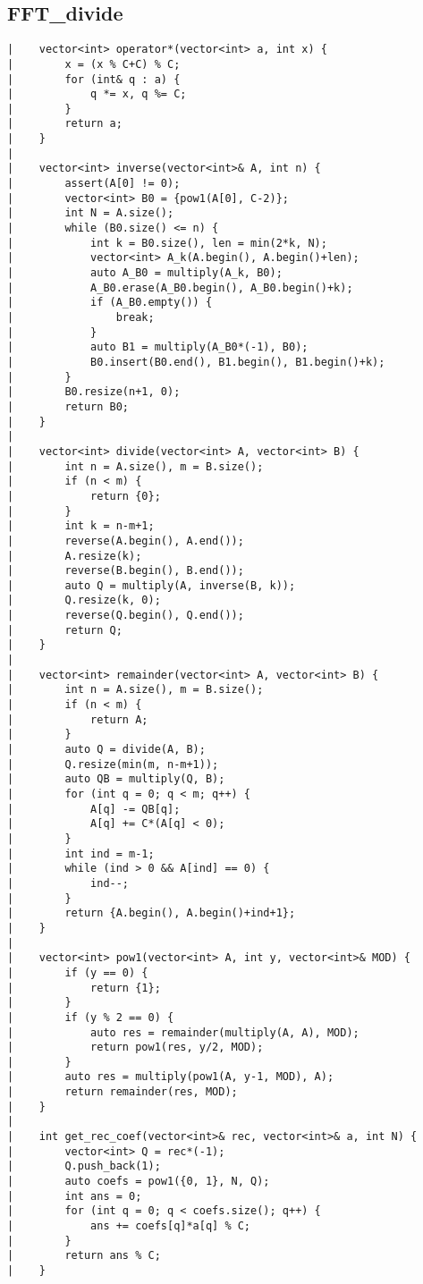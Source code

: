\documentclass[a4paper, 10pt]{article}
\begin{document}
\begin{center}
\section*{FFT\_divide}
\begin{verbatim}
|    vector<int> operator*(vector<int> a, int x) {
|        x = (x % C+C) % C;
|        for (int& q : a) {
|            q *= x, q %= C;
|        }
|        return a;
|    }
|    
|    vector<int> inverse(vector<int>& A, int n) {
|        assert(A[0] != 0);
|        vector<int> B0 = {pow1(A[0], C-2)};
|        int N = A.size();
|        while (B0.size() <= n) {
|            int k = B0.size(), len = min(2*k, N);
|            vector<int> A_k(A.begin(), A.begin()+len);
|            auto A_B0 = multiply(A_k, B0);
|            A_B0.erase(A_B0.begin(), A_B0.begin()+k);
|            if (A_B0.empty()) {
|                break;
|            }
|            auto B1 = multiply(A_B0*(-1), B0);
|            B0.insert(B0.end(), B1.begin(), B1.begin()+k);
|        }
|        B0.resize(n+1, 0);
|        return B0;
|    }
|    
|    vector<int> divide(vector<int> A, vector<int> B) {
|        int n = A.size(), m = B.size();
|        if (n < m) {
|            return {0};
|        }
|        int k = n-m+1;
|        reverse(A.begin(), A.end());
|        A.resize(k);
|        reverse(B.begin(), B.end());
|        auto Q = multiply(A, inverse(B, k));
|        Q.resize(k, 0);
|        reverse(Q.begin(), Q.end());
|        return Q;
|    }
|    
|    vector<int> remainder(vector<int> A, vector<int> B) {
|        int n = A.size(), m = B.size();
|        if (n < m) {
|            return A;
|        }
|        auto Q = divide(A, B);
|        Q.resize(min(m, n-m+1));
|        auto QB = multiply(Q, B);
|        for (int q = 0; q < m; q++) {
|            A[q] -= QB[q];
|            A[q] += C*(A[q] < 0);
|        }
|        int ind = m-1;
|        while (ind > 0 && A[ind] == 0) {
|            ind--;
|        }
|        return {A.begin(), A.begin()+ind+1};
|    }
|    
|    vector<int> pow1(vector<int> A, int y, vector<int>& MOD) {
|        if (y == 0) {
|            return {1};
|        }
|        if (y % 2 == 0) {
|            auto res = remainder(multiply(A, A), MOD);
|            return pow1(res, y/2, MOD);
|        }
|        auto res = multiply(pow1(A, y-1, MOD), A);
|        return remainder(res, MOD);
|    }
|    
|    int get_rec_coef(vector<int>& rec, vector<int>& a, int N) {
|        vector<int> Q = rec*(-1);
|        Q.push_back(1);
|        auto coefs = pow1({0, 1}, N, Q);
|        int ans = 0;
|        for (int q = 0; q < coefs.size(); q++) {
|            ans += coefs[q]*a[q] % C;
|        }
|        return ans % C;
|    }
\end{verbatim}


\end{center}
\end{document}

